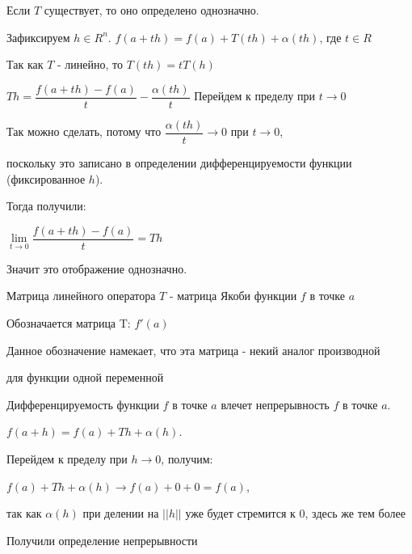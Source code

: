 \begin{remark} \thmslashn

    Если $T$ существует, то оно определено однозначно. 

    Зафиксируем $h \in R^n$. $f(a + th) = f(a) + T(th) + \alpha(th)$, где $t \in R$

    Так как $T$ - линейно, то $T(th) = t T(h)$

    $Th = \dfrac{f(a + th) - f(a)}{t} - \dfrac{\alpha(th)}{t}$ Перейдем к пределу при $t \to 0$

    Так можно сделать, потому что $\dfrac{\alpha(th)}{t} \to 0$ при $t \to 0$,

    поскольку это записано в определении дифференцируемости функции (фиксированное $h$).

    Тогда получили:

    $\lim\limits_{t \to 0} \dfrac{f(a + th) - f(a)}{t} = Th$

    Значит это отображение однозначно.
\end{remark}

\begin{definition} \thmslashn

    Матрица линейного оператора $T$ - матрица Якоби функции $f$ в точке $a$

    Обозначается матрица T: $f'(a)$

    Данное обозначение намекает, что эта матрица - некий аналог производной

    для функции одной переменной
   
\end{definition}

\begin{remark} \thmslashn

    Дифференцируемость функции $f$ в точке $a$ влечет непрерывность $f$ в точке $a$. 

    $f(a + h) = f(a) + Th + \alpha(h)$. 

    Перейдем к пределу при $h \to 0$, получим: 

    $f(a) + Th + \alpha(h) \to f(a) + 0 + 0 = f(a)$,

    так как $\alpha(h)$ при делении на $||h||$ уже будет стремится к 0, здесь же тем более

    Получили определение непрерывности

\end{remark}


